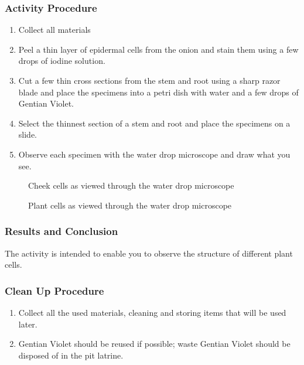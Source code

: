 \subsubsection*{Activity Procedure}
\begin{enumerate}
\item{Collect all materials}
\item{Peel a thin layer of epidermal cells from the onion and stain them using a few drops of iodine solution.}
\item{Cut a few thin cross sections from the stem and root using a sharp razor blade and place the specimens into a petri dish with water and a few drops of Gentian Violet.}
\item{Select the thinnest section of a stem and root and place the specimens on a slide.}
\item{Observe each specimen with the water drop microscope and draw what you see.}
\end{enumerate}

\begin{figure}[h]
\begin{center}
\def\svgwidth{6cm}

\caption{Cheek cells as viewed through the water drop microscope}
\label{fig:cheek}
\end{center}
\end{figure}

\begin{figure}[h]
\begin{center}
\def\svgwidth{6cm}

\caption{Plant cells as viewed through the water drop microscope}
\label{fig:plantcell}
\end{center}
\end{figure}

\subsubsection*{Results and Conclusion}
The activity is intended to enable you to observe the structure of different plant cells.

\subsubsection*{Clean Up Procedure}
\begin{enumerate}
\item{Collect all the used materials, cleaning and storing items that will be used later.}
\item{Gentian Violet should be reused if possible; waste Gentian Violet should be disposed of in the pit latrine.}
\end{enumerate}

